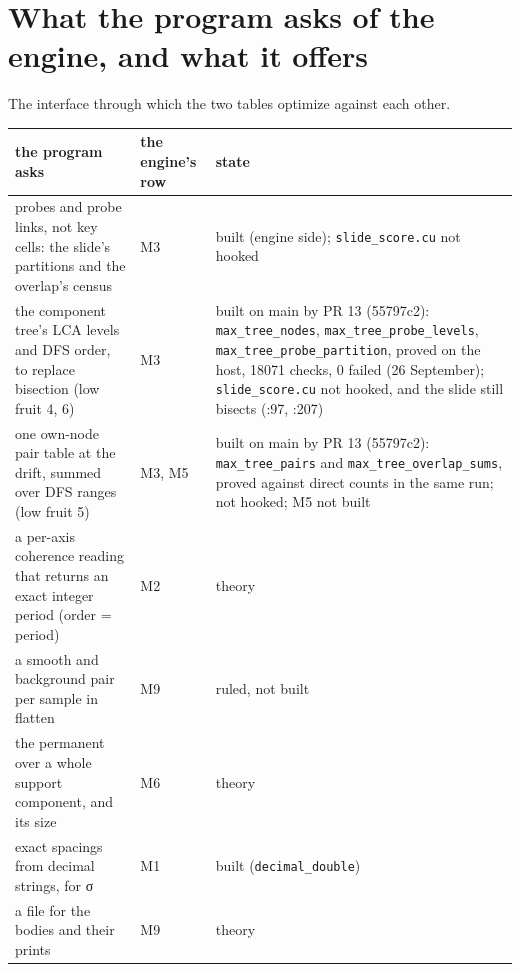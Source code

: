 \section{\texorpdfstring{What the program asks of the engine, and what it offers}{What the program asks of the engine, and what it offers}}

The interface through which the two tables optimize against each other.

{\small
\setlength{\tabcolsep}{6pt}
\begin{longtable}{>{\RaggedRight\arraybackslash}p{}>{\RaggedRight\arraybackslash}p{}>{\RaggedRight\arraybackslash}p{}}
\toprule
the program asks & the engine's row & state \\
\midrule
\endhead
probes and probe links, not key cells: the slide's partitions and the overlap's census & M3 & built (engine side); \texttt{slide\_\allowbreak{}score.\allowbreak{}cu} not hooked \\
the component tree's LCA levels and DFS order, to replace bisection (low fruit 4, 6) & M3 & built on main by PR 13 (55797c2): \texttt{max\_\allowbreak{}tree\_\allowbreak{}nodes}, \texttt{max\_\allowbreak{}tree\_\allowbreak{}probe\_\allowbreak{}levels}, \texttt{max\_\allowbreak{}tree\_\allowbreak{}probe\_\allowbreak{}partition}, proved on the host, 18071 checks, 0 failed (26 September); \texttt{slide\_\allowbreak{}score.\allowbreak{}cu} not hooked, and the slide still bisects (:97, :207) \\
one own-node pair table at the drift, summed over DFS ranges (low fruit 5) & M3, M5 & built on main by PR 13 (55797c2): \texttt{max\_\allowbreak{}tree\_\allowbreak{}pairs} and \texttt{max\_\allowbreak{}tree\_\allowbreak{}overlap\_\allowbreak{}sums}, proved against direct counts in the same run; not hooked; M5 not built \\
a per-axis coherence reading that returns an exact integer period (order = period) & M2 & theory \\
a smooth and background pair per sample in flatten & M9 & ruled, not built \\
the permanent over a whole support component, and its size & M6 & theory \\
exact spacings from decimal strings, for σ & M1 & built (\texttt{decimal\_\allowbreak{}double}) \\
a file for the bodies and their prints & M9 & theory \\

\end{longtable}}
